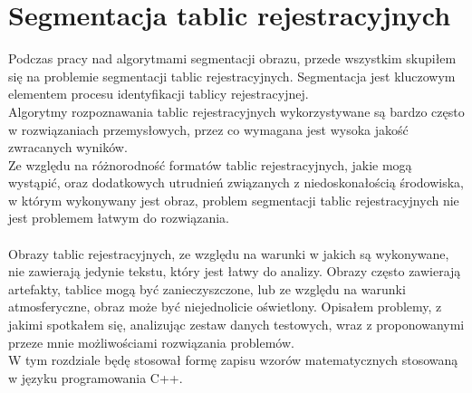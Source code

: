 \section{Segmentacja tablic rejestracyjnych}
Podczas pracy nad algorytmami segmentacji obrazu, przede wszystkim skupiłem się na problemie segmentacji tablic rejestracyjnych. Segmentacja jest kluczowym elementem procesu identyfikacji tablicy rejestracyjnej.\\
Algorytmy rozpoznawania tablic rejestracyjnych wykorzystywane są bardzo często w rozwiązaniach przemysłowych, przez co wymagana jest wysoka jakość zwracanych wyników.\\
Ze względu na różnorodność formatów tablic rejestracyjnych, jakie mogą wystąpić, oraz dodatkowych utrudnień związanych z niedoskonałością środowiska, w którym wykonywany jest obraz, problem segmentacji tablic rejestracyjnych nie jest problemem łatwym do rozwiązania.
\paragraph{}
Obrazy tablic rejestracyjnych, ze względu na warunki w jakich są wykonywane, nie zawierają jedynie tekstu, który jest łatwy do analizy. Obrazy często zawierają artefakty, tablice mogą być zanieczyszczone, lub ze względu na warunki atmosferyczne, obraz może być niejednolicie oświetlony. Opisałem problemy, z jakimi spotkałem się, analizując zestaw danych testowych, wraz z proponowanymi przeze mnie możliwościami rozwiązania problemów.\\
W tym rozdziale będę stosował formę zapisu wzorów matematycznych stosowaną w języku programowania C++.

